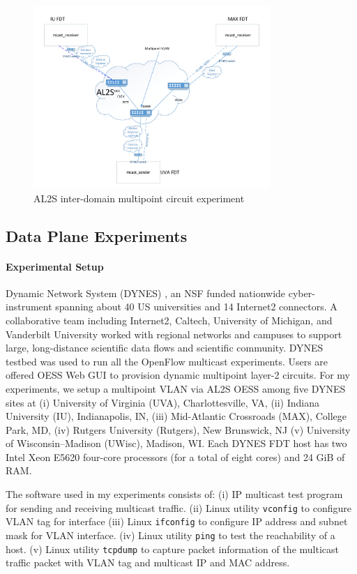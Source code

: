 \begin{figure}[htb!]
\centering
\includegraphics[width=0.8\textwidth]{figures/AL2S-mcast.pdf}
\caption{AL2S inter-domain multipoint circuit experiment}
\label{fig:wanmulticast}
\end{figure}




\subsection{Data Plane Experiments}
\paragraph{Experimental Setup} 
Dynamic Network System (DYNES) \cite{1742-6596-396-4-042065}, an NSF funded nationwide cyber-instrument spanning about 40 US universities and 14 Internet2 connectors. A collaborative team including Internet2, Caltech, University of Michigan, and Vanderbilt University worked with regional networks and campuses to support large, long-distance scientific data flows and scientific community. DYNES testbed was used to run all the OpenFlow multicast experiments. Users are offered OESS Web GUI to provision dynamic multipoint layer-2 circuits. For my experiments, we setup a multipoint VLAN via AL2S OESS among five DYNES sites at (i) University of Virginia (UVA), Charlottesville, VA, (ii) Indiana University (IU), Indianapolis, IN, (iii) Mid-Atlantic Crossroads (MAX), College Park, MD, (iv) Rutgers University (Rutgers), New Brunswick, NJ (v) University of Wisconsin–Madison (UWisc), Madison, WI. Each DYNES FDT host has two Intel Xeon
E5620 four-core processors (for a total of eight cores) and
24 GiB of RAM. 

The software used in my experiments consists of: (i) IP multicast test program for sending and receiving multicast traffic.  (ii) Linux utility \texttt{vconfig} to configure VLAN tag for interface  (iii) Linux \texttt{ifconfig} to configure IP address and subnet mask for VLAN interface. (iv) Linux utility \texttt{ping} to test the reachability of a host. (v) Linux utility \texttt{tcpdump} to capture packet information of the multicast traffic packet with VLAN tag and multicast IP and MAC address. 

